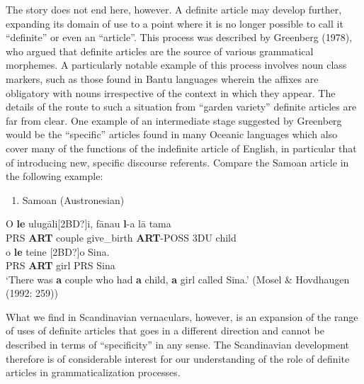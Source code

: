 The story does not end here, however. A definite article may develop further, expanding its domain of use to a point where it is no longer possible to call it “definite” or even an “article”. This process was described by Greenberg (1978), who argued that definite articles are the source of various grammatical morphemes.  A particularly notable example of this process involves noun class markers, such  as those found in Bantu languages wherein the affixes are obligatory with nouns irrespective of the context in which they appear. The details of the route to such a situation from “garden variety” definite articles are far from clear. One example of an intermediate stage suggested by Greenberg would be the “specific” articles found in many Oceanic languages which also cover many of the functions of the indefinite article of English, in particular that of introducing new, specific discourse referents. Compare the Samoan article  in the following example: 

\begin{enumerate} %
\item 
Samoan (Austronesian)

\end{enumerate} %
\ea\label{}
\gll [2BD?]O  \textbf{le} ulug\=ali[2BD?]i,  f\=anau  \textbf{l}{}-a  l\=a  tama\\


PRS  \textbf{ART} couple  give\_birth  \textbf{ART}{}-POSS  3DU  child\\ %


\ea\label{}
\gll [2BD?]o  \textbf{le} teine  [2BD?]o  Sina.\\


PRS  \textbf{ART} girl  PRS  Sina\\ %


‘There was \textbf{a} couple who had \textbf{a} child, \textbf{a} girl called Sina.’ (Mosel \& Hovdhaugen (1992: 259))
\z

What we find in Scandinavian vernaculars, however, is an expansion of the range of uses of definite articles that goes in a different direction and cannot be described in terms of “specificity” in any sense. The Scandinavian development therefore is of considerable interest for our understanding of the role of definite articles in grammaticalization processes.

